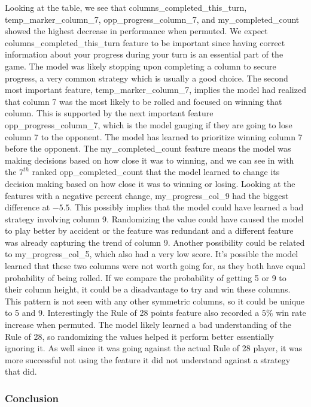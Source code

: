 \documentclass[12pt]{article}
\begin{document}
\begin{thesis}
Looking at the table, we see that columns\_completed\_this\_turn, temp\_marker\_column\_7, opp\_progress\_column\_7, and my\_completed\_count showed the highest decrease in performance when permuted. We expect columns\_completed\_this\_turn feature to be important since having correct information about your progress during your turn is an essential part of the game. The model was likely stopping upon completing a column to secure progress, a very common strategy which is usually a good choice. The second most important feature, temp\_marker\_column\_7, implies the model had realized that column 7 was the most likely to be rolled and focused on winning that column. This is supported by the next important feature opp\_progress\_column\_7, which is the model gauging if they are going to lose column 7 to the opponent. The model has learned to prioritize winning column 7 before the opponent. The my\_completed\_count feature means the model was making decisions based on how close it was to winning, and we can see in with the \(7^{th}\) ranked opp\_completed\_count that the model learned to change its decision making based on how close it was to winning or losing. Looking at the features with a negative percent change, my\_progress\_col\_9 had the biggest difference at \(-5.5\). This possibly implies that the model could have learned a bad strategy involving column 9. Randomizing the value could have caused the model to play better by accident or the feature was redundant and a different feature was already capturing the trend of column 9. Another possibility could be related to my\_progress\_col\_5, which also had a very low score. It's possible the model learned that these two columns were not worth going for, as they both have equal probability of being rolled. If we compare the probability of getting 5 or 9 to their column height, it could be a disadvantage to try and win these columns. This pattern is not seen with any other symmetric columns, so it could be unique to 5 and 9. Interestingly the Rule of 28 points feature also recorded a \(5\%\) win rate increase when permuted. The model likely learned a bad understanding of the Rule of 28, so randomizing the values helped it perform better essentially ignoring it. As well since it was going against the actual Rule of 28 player, it was more successful not using the feature it did not understand against a strategy that did.

\subsubsection{Conclusion}\label{conclusion-2}


\end{thesis}
\end{document}
